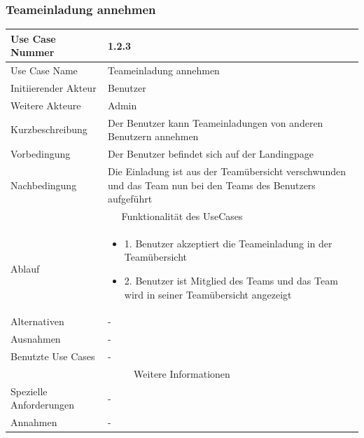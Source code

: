 \documentclass[10pt,a4paper]{article}
\begin{document}
		\subsubsection{Teameinladung annehmen}		
		\begin{tabular}{|l|p{.5\linewidth}|}
			\hline Use Case Nummer & 1.2.3 \\ 
			\hline Use Case Name & Teameinladung annehmen \\ 
			\hline Initiierender Akteur & Benutzer \\
			\hline Weitere Akteure & Admin \\
			\hline Kurzbeschreibung & Der Benutzer kann Teameinladungen von anderen Benutzern annehmen \\
			\hline Vorbedingung & Der Benutzer befindet sich auf der Landingpage \\
			\hline Nachbedingung & Die Einladung ist aus der Teamübersicht verschwunden und das Team nun bei den Teams des Benutzers aufgeführt \\
			\hline \multicolumn{2}{|c|}{Funktionalität des UseCases}\\
			\hline Ablauf & \begin{itemize}
				\item 1. Benutzer akzeptiert die Teameinladung in der Teamübersicht
				\item 2. Benutzer ist Mitglied des Teams und das Team wird in seiner Teamübersicht angezeigt
			\end{itemize} \\
			\hline Alternativen & - \\
			\hline Ausnahmen & - \\
			\hline Benutzte Use Cases & - \\
			\hline \multicolumn{2}{|c|}{Weitere Informationen} \\
			\hline Spezielle Anforderungen & - \\
			\hline Annahmen & - \\
			\hline
		\end{tabular}
			
\end{document}
